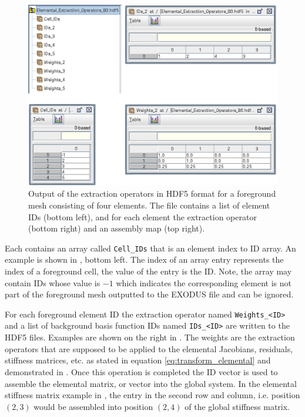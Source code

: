 \begin{figure}[h]
    \vspace{0.5cm}
    \begin{center}
    \includegraphics[width=12cm]{Figures/extraction_operator_output.png}
    \caption{Output of the extraction operators in HDF5 format for a foreground mesh consisting of four elements. The file contains a list of element IDs (bottom left), and for each element the extraction operator (bottom right) and an assembly map (top right).} 
    \label{fig:extraction_operator_output}
    \end{center}
\end{figure}

Each contains an array called \texttt{Cell\_IDs} that is an element index to ID array. An example is shown in , bottom left. The index of an array entry represents the index of a foreground cell, the value of the entry is the ID. Note, the array may contain IDs whose value is $-1$ which indicates the corresponding element is not part of the foreground mesh outputted to the EXODUS file and can be ignored.

For each foreground element ID the extraction operator named \texttt{Weights\_<ID>} and a list of background basis function IDs named \texttt{IDs\_<ID>} are written to the HDF5 files. Examples are shown on the right in . The weights are the extraction operators that are supposed to be applied to the elemental Jacobians, residuals, stiffness matrices, etc. as stated in equation \eqref{eq:transform_elemental} and demonstrated in . Once this operation is completed the ID vector is used to assemble the elemental matrix, or vector into the global system. In the elemental stiffness matrix example in , the entry in the second row and column, i.e. position $(2,3)$ would be assembled into position $(2,4)$ of the global stiffness matrix.

